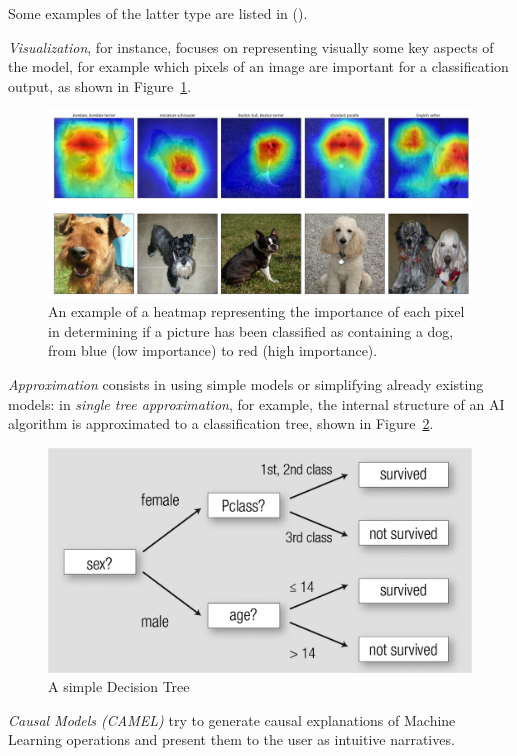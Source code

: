 \documentclass[conference]{IEEEtran}
\begin{document}
Some examples of the latter type are listed in (\cite{nasaxai}).

\textit{Visualization}, for instance, focuses on representing visually
some key aspects of the model, for example which pixels of an image are important for a classification output, as shown in Figure~\ref{fig:heatmap}.

\begin{figure}[h!] \centering
    \includegraphics[width=0.9\linewidth]{images/dog_localization.png}
    \caption{An example of a heatmap representing the importance of each pixel
        in determining if a picture has been classified as containing a dog, from
        blue (low importance) to red (high importance). } \label{fig:heatmap}
\end{figure}

\textit{Approximation} consists in using simple models or simplifying already
existing models: in \textit{single tree approximation}, for example, the
internal structure of an AI algorithm is approximated to a classification tree,
shown in Figure~\ref{fig:dectree}.

\begin{figure}[ht!] \centering
    \includegraphics[width=0.9\linewidth]{images/dectree} \caption{A simple
        Decision Tree} \label{fig:dectree} \end{figure}

\textit{Causal Models (CAMEL)} try to generate causal explanations of Machine
Learning operations and present them to the user as intuitive narratives.
\end{document}
